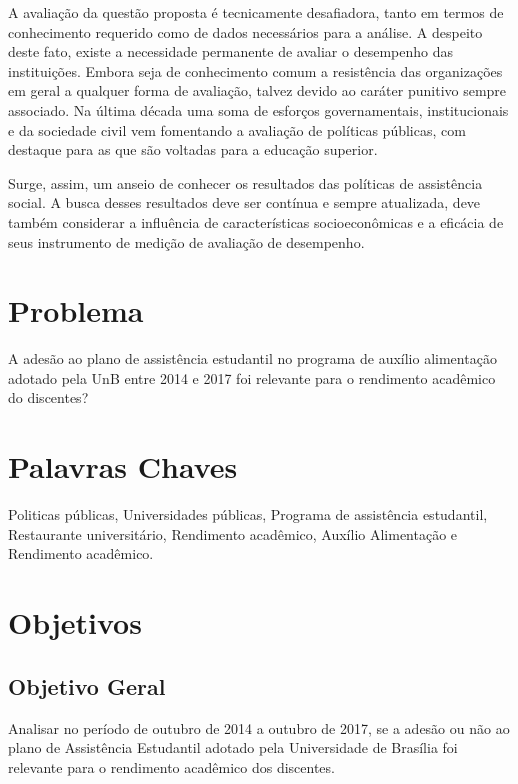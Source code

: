 A avaliação da questão proposta é tecnicamente desafiadora, tanto em termos de conhecimento requerido como de dados necessários para a análise. A despeito deste fato, existe a necessidade permanente de avaliar o desempenho das instituições. Embora seja de conhecimento comum a resistência das organizações em geral a qualquer forma de avaliação, talvez devido ao caráter punitivo sempre associado. Na última década uma soma de esforços governamentais, institucionais e da sociedade civil vem fomentando a avaliação de  políticas públicas, com destaque para as que são voltadas para a educação superior.


Surge, assim, um anseio de conhecer os resultados das políticas de assistência social. A busca desses resultados deve ser contínua e sempre atualizada, deve também considerar a influência de características socioeconômicas e a eficácia de seus instrumento de medição de avaliação de desempenho.

\section{Problema}%
A adesão ao plano de assistência estudantil no programa de auxílio alimentação adotado pela UnB entre 2014 e 2017 foi relevante para o rendimento acadêmico do discentes?

\section{Palavras Chaves}%
Politicas públicas, Universidades públicas, Programa de assistência estudantil, Restaurante universitário, Rendimento acadêmico, Auxílio Alimentação e Rendimento acadêmico.


\section{Objetivos}%

\subsection{Objetivo Geral}
Analisar no período de outubro de 2014 a outubro de 2017, se a adesão ou não ao plano de Assistência Estudantil adotado pela Universidade de Brasília foi relevante para o rendimento acadêmico dos discentes.


